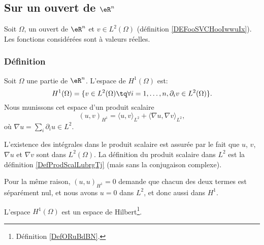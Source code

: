\subsection{Sur un ouvert de \( \eR^n\)}

Soit \( \Omega\), un ouvert de \( \eR^n\) et \( v\in L^2(\Omega)\) (définition \ref{DEFooSVCHooIwwuIx}). Les fonctions considérées sont à valeurs réelles.


\subsubsection{Définition}

\begin{definition}
    Soit \( \Omega\) une partie de \( \eR^n\). L'espace de  \( H^1(\Omega)\) est:
    \begin{equation}
        H^1(\Omega)=\{ v\in L^2(\Omega)\tq \forall i=1,\ldots, n, \partial_iv\in L^2(\Omega) \}.
    \end{equation}
    Nous munissons cet espace d'un produit scalaire
    \begin{equation}        \label{EQooQRMKooLaMpcp}
        (u,v)_{H^1}=\langle u, v\rangle_{L^2}+\langle \nabla u, \nabla v\rangle_{L^2},
    \end{equation}
    où \( \nabla u=\sum_i\partial_iu\in L^2\).
\end{definition}
L'existence des intégrales dans le produit scalaire est assurée par le fait que \( u\), \( v\), \( \nabla u\) et \( \nabla v\) sont dans \( L^2(\Omega)\). La définition du produit scalaire dans \( L^2\) est la définition \ref{DefProdScalLubrgTj} (mais sans la conjugaison complexe).

Pour la même raison, \( (u,u)_{H^1}=0\) demande que chacun des deux termes est séparément nul, et nous avons \( u=0\) dans \( L^2\), et donc aussi dans \( H^1\).

\begin{theorem}
    L'espace \( H^1(\Omega)\) est un espace de Hilbert\footnote{Définition \ref{DefORuBdBN}.}.
\end{theorem}

